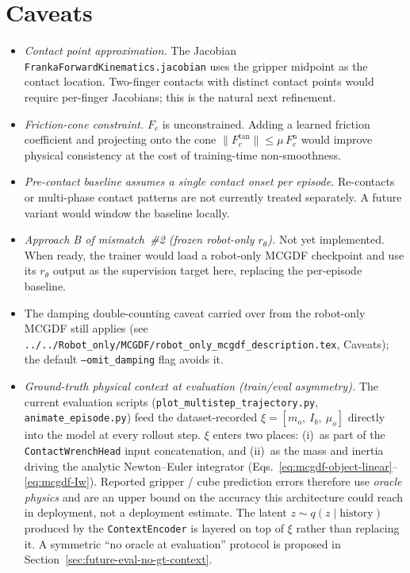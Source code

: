 \documentclass[11pt]{article}
\begin{document}
\section{Caveats}

\begin{itemize}
  \item \emph{Contact point approximation.}  The Jacobian
    \texttt{FrankaForwardKinematics.jacobian} uses the gripper midpoint as
    the contact location.  Two-finger contacts with distinct contact points
    would require per-finger Jacobians; this is the natural next refinement.
  \item \emph{Friction-cone constraint.}  $F_c$ is unconstrained.  Adding a
    learned friction coefficient and projecting onto the cone
    $\|F_c^{\mathrm{tan}}\|\le\mu\,F_c^{\mathrm{n}}$ would improve
    physical consistency at the cost of training-time non-smoothness.
  \item \emph{Pre-contact baseline assumes a single contact onset per
    episode.}  Re-contacts or multi-phase contact patterns are not currently
    treated separately.  A future variant would window the baseline locally.
  \item \emph{Approach B of mismatch~\#2 (frozen robot-only $r_\theta$).}
    Not yet implemented.  When ready, the trainer would load a robot-only
    MCGDF checkpoint and use its $r_\theta$ output as the supervision target
    here, replacing the per-episode baseline.
  \item The damping double-counting caveat carried over from the robot-only
    MCGDF still applies (see
    \texttt{../../Robot\_only/MCGDF/robot\_only\_mcgdf\_description.tex},
    Caveats); the default \texttt{--omit\_damping} flag avoids it.
  \item \emph{Ground-truth physical context at evaluation
    (train/eval asymmetry).}
    \label{caveat:gt-context-eval}
    The current evaluation scripts
    (\texttt{plot\_multistep\_trajectory.py},
    \texttt{animate\_episode.py}) feed the dataset-recorded
    $\xi = [m_o,\ I_b,\ \mu_o]$ directly into the model at every rollout
    step. $\xi$ enters two places:
    (i)~as part of the \texttt{ContactWrenchHead} input concatenation, and
    (ii)~as the mass and inertia driving the analytic Newton--Euler
    integrator
    (Eqs.~\eqref{eq:mcgdf-object-linear}--\eqref{eq:mcgdf-Iw}).
    Reported gripper / cube prediction errors therefore use \emph{oracle
    physics} and are an upper bound on the accuracy this architecture
    could reach in deployment, not a deployment estimate. The latent
    $z\sim q(z\mid\text{history})$ produced by the
    \texttt{ContextEncoder} is layered on top of $\xi$ rather than
    replacing it. A symmetric ``no oracle at evaluation'' protocol is
    proposed in
    Section~\ref{sec:future-eval-no-gt-context}.
\end{itemize}
\end{document}
